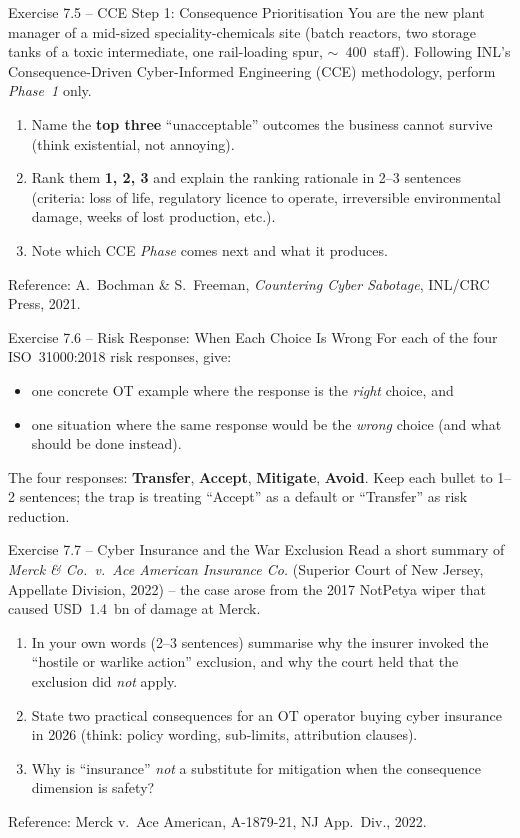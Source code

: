 \documentclass[11pt,a4paper]{article}
\begin{document}
\begin{taskbox}{Exercise 7.5 -- CCE Step 1: Consequence Prioritisation}
You are the new plant manager of a mid-sized speciality-chemicals site
(batch reactors, two storage tanks of a toxic intermediate, one rail-loading
spur, $\sim$~400~staff). Following INL's Consequence-Driven Cyber-Informed
Engineering (CCE) methodology, perform \emph{Phase~1} only.
\begin{enumerate}
  \item Name the \textbf{top three} ``unacceptable'' outcomes the business
        cannot survive (think existential, not annoying).
  \item Rank them \textbf{1, 2, 3} and explain the ranking rationale in 2--3
        sentences (criteria: loss of life, regulatory licence to operate,
        irreversible environmental damage, weeks of lost production, etc.).
  \item Note which CCE \emph{Phase} comes next and what it produces.
\end{enumerate}
Reference: A.~Bochman \& S.~Freeman, \emph{Countering Cyber Sabotage},
INL/CRC Press, 2021.
\end{taskbox}

\begin{taskbox}{Exercise 7.6 -- Risk Response: When Each Choice Is Wrong}
For each of the four ISO~31000:2018 risk responses, give:
\begin{itemize}
  \item one concrete OT example where the response is the
        \emph{right} choice, and
  \item one situation where the same response would be the
        \emph{wrong} choice (and what should be done instead).
\end{itemize}
The four responses: \textbf{Transfer}, \textbf{Accept}, \textbf{Mitigate},
\textbf{Avoid}. Keep each bullet to 1--2 sentences; the trap is treating
``Accept'' as a default or ``Transfer'' as risk reduction.
\end{taskbox}

\begin{taskbox}{Exercise 7.7 -- Cyber Insurance and the War Exclusion}
Read a short summary of \emph{Merck \& Co.\ v.\ Ace American Insurance Co.}
(Superior Court of New Jersey, Appellate Division, 2022) -- the case
arose from the 2017 NotPetya wiper that caused USD~1.4~bn of damage at Merck.
\begin{enumerate}
  \item In your own words (2--3 sentences) summarise why the insurer
        invoked the ``hostile or warlike action'' exclusion, and why
        the court held that the exclusion did \emph{not} apply.
  \item State two practical consequences for an OT operator buying
        cyber insurance in 2026 (think: policy wording, sub-limits,
        attribution clauses).
  \item Why is ``insurance'' \emph{not} a substitute for mitigation when
        the consequence dimension is safety?
\end{enumerate}
Reference: Merck v.\ Ace American, A-1879-21, NJ App.\ Div., 2022.
\end{taskbox}
\end{document}

